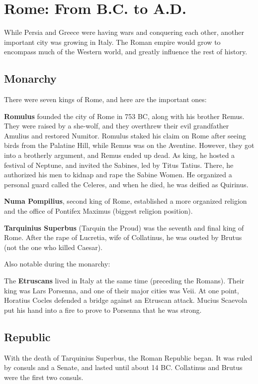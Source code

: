 \section{Rome: From B.C. to A.D.}

While Persia and Greece were having wars and conquering each other, another important city was growing in Italy.
The Roman empire would grow to encompass much of the Western world,
and greatly influence the rest of history.

\subsection*{Monarchy}

There were seven kings of Rome, and here are the important ones:

\textbf{Romulus} founded the city of Rome in 753 BC, along with his brother Remus.
They were raised by a she-wolf, and they overthrew their evil grandfather Amulius and restored Numitor.
Romulus staked his claim on Rome after seeing birds from the Palatine Hill, while Remus was on the Aventine.
However, they got into a brotherly argument, and Remus ended up dead.
As king, he hosted a festival of Neptune, and invited the Sabines, led by Titus Tatius.
There, he authorized his men to kidnap and rape the Sabine Women.
He organized a personal guard called the Celeres,
and when he died, he was deified as Quirinus.

\textbf{Numa Pompilius}, second king of Rome,
established a more organized religion and the office of Pontifex Maximus (biggest religion position).

\textbf{Tarquinius Superbus} (Tarquin the Proud) was the seventh and final king of Rome.
After the rape of Lucretia, wife of Collatinus, he was ousted by Brutus (not the one who killed Caesar).

Also notable during the monarchy:

The \textbf{Etruscans} lived in Italy at the same time (preceding the Romans).
Their king was Lars Porsenna, and one of their major cities was Veii.
At one point, Horatius Cocles defended a bridge against an Etruscan attack.
Mucius Scaevola put his hand into a fire to prove to Porsenna that he was strong.

\subsection*{Republic}

With the death of Tarquinius Superbus, the Roman Republic began.
It was ruled by consuls and a Senate, and lasted until about 14 BC\@.
Collatinus and Brutus were the first two consuls.

